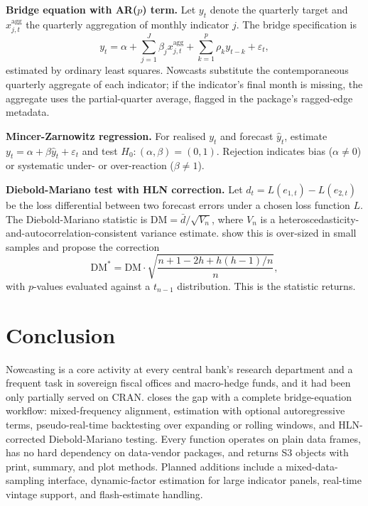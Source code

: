 \textbf{Bridge equation with AR(\(p\)) term.} Let \(y_t\) denote the
quarterly target and \(x_{j,t}^{\mathrm{agg}}\) the quarterly
aggregation of monthly indicator \(j\). The bridge specification is
\[y_t = \alpha + \sum_{j=1}^{J} \beta_j x_{j,t}^{\mathrm{agg}}
  + \sum_{k=1}^{p} \rho_k y_{t-k} + \varepsilon_t,\]
estimated by ordinary least squares. Nowcasts substitute the
contemporaneous quarterly aggregate of each indicator; if the
indicator's final month is missing, the aggregate uses the
partial-quarter average, flagged in the package's ragged-edge
metadata.

\textbf{Mincer-Zarnowitz regression.} For realised \(y_t\) and forecast
\(\hat{y}_t\), estimate \(y_t = \alpha + \beta \hat{y}_t + \varepsilon_t\)
and test \(H_0: (\alpha, \beta) = (0, 1)\). Rejection indicates bias
(\(\alpha \neq 0\)) or systematic under- or over-reaction
(\(\beta \neq 1\)).

\textbf{Diebold-Mariano test with HLN correction.} Let
\(d_t = L(e_{1,t}) - L(e_{2,t})\) be the loss differential between
two forecast errors under a chosen loss function \(L\). The
Diebold-Mariano statistic is \(\mathrm{DM} = \bar{d} / \sqrt{V_n}\),
where \(V_n\) is a heteroscedasticity-and-autocorrelation-consistent
variance estimate. \citet{harvey1997testing} show this is over-sized in
small samples and propose the correction
\[\mathrm{DM}^* = \mathrm{DM} \cdot
  \sqrt{\frac{n + 1 - 2h + h(h-1)/n}{n}},\]
with \(p\)-values evaluated against a \(t_{n-1}\) distribution. This is
the statistic  returns.

\section{Conclusion}\label{conclusion}

Nowcasting is a core activity at every central bank's research
department and a frequent task in sovereign fiscal offices and
macro-hedge funds, and it had been only partially served on CRAN.
 closes the gap with a complete bridge-equation
workflow: mixed-frequency alignment, estimation with optional
autoregressive terms, pseudo-real-time backtesting over expanding or
rolling windows, and HLN-corrected Diebold-Mariano testing.
Every function operates on plain data frames, has no hard
dependency on data-vendor packages, and returns S3 objects with
print, summary, and plot methods. Planned additions include a
mixed-data-sampling interface, dynamic-factor estimation for large
indicator panels, real-time vintage support, and flash-estimate
handling.

